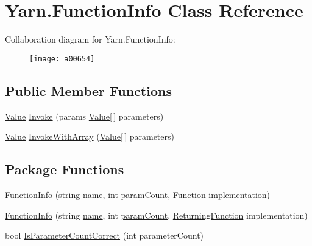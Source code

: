 \hypertarget{a00106}{\section{Yarn.\-Function\-Info Class Reference}
\label{a00106}
}


Collaboration diagram for Yarn.\-Function\-Info\-:
\nopagebreak
\begin{figure}[H]
\begin{center}
\leavevmode
\texttt{[image: a00654]}
\end{center}
\end{figure}
\subsection*{Public Member Functions}
\begin{DoxyCompactItemize}
\item 
\hyperlink{a00187}{Value} \hyperlink{a00106_ab400ac66785d7df2e3fc0f3ce3796044}{Invoke} (params \hyperlink{a00187}{Value}\mbox{[}$\,$\mbox{]} parameters)
\item 
\hyperlink{a00187}{Value} \hyperlink{a00106_a3ce11058d35232907a738de4bb094c67}{Invoke\-With\-Array} (\hyperlink{a00187}{Value}\mbox{[}$\,$\mbox{]} parameters)
\end{DoxyCompactItemize}
\subsection*{Package Functions}
\begin{DoxyCompactItemize}
\item 
\hyperlink{a00106_a93457cd0e838cb2ef59cc2a3a46ce758}{Function\-Info} (string \hyperlink{a00106_adb38e83e3c1597b553aeff14bef5bfcb}{name}, int \hyperlink{a00106_aa8527de9e4f153b05164ccaf167c3186}{param\-Count}, \hyperlink{a00051_ae0be2e5cf13d5779816102439e61ff1a}{Function} implementation)
\item 
\hyperlink{a00106_a41d97c09da25caede70cb734d18113b9}{Function\-Info} (string \hyperlink{a00106_adb38e83e3c1597b553aeff14bef5bfcb}{name}, int \hyperlink{a00106_aa8527de9e4f153b05164ccaf167c3186}{param\-Count}, \hyperlink{a00051_a5177bf74fbfe7303fac9d8236c2e514b}{Returning\-Function} implementation)
\item 
bool \hyperlink{a00106_a1ed09ff8aafa230a0d2bbc23cd6cd763}{Is\-Parameter\-Count\-Correct} (int parameter\-Count)
\end{DoxyCompactItemize}
